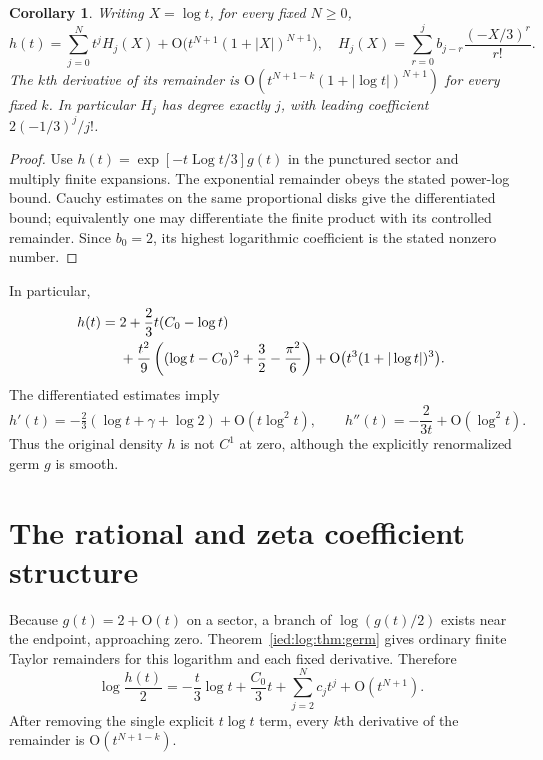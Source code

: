 \documentclass[11pt,letterpaper]{article}
\newtheorem{corollary}[theorem]{Corollary}
\theoremstyle{remark}\newtheorem{remark}[theorem]{Remark}
\newcommand{\Oh}{\mathrm O}\newcommand{\supp}{\operatorname{supp}}
\newcommand{\Log}{\operatorname{Log}}
\begin{document}
\begin{corollary}\label{ied:log:cor:densityseries}
Writing $X=\log t$, for every fixed $N\ge0$,
\begin{equation}\label{ied:log:eq:densityseries}
 h(t)=\sum_{j=0}^N t^jH_j(X)
 +\Oh\bigl(t^{N+1}(1+|X|)^{N+1}\bigr),\quad
 H_j(X)=\sum_{r=0}^j b_{j-r}\frac{(-X/3)^r}{r!}.
\end{equation}
The $k$th derivative of its remainder is
$\Oh(t^{N+1-k}(1+|\log t|)^{N+1})$ for every fixed $k$.
In particular $H_j$ has degree exactly $j$, with leading coefficient
$2(-1/3)^j/j!$.
\end{corollary}
\begin{proof}
Use $h(t)=\exp[-t\Log t/3]g(t)$ in the punctured sector and multiply finite expansions. The exponential remainder obeys the stated power-log bound. Cauchy estimates on the same proportional disks give the differentiated bound; equivalently one may differentiate the finite product with its controlled remainder. Since $b_0=2$, its highest logarithmic coefficient is the stated nonzero number.
\end{proof}
In particular,
\begin{align}\label{ied:log:eq:hfirst}
 h(t)={}&2+\frac23t(C_0-\log t)\notag\\
 &+\frac{t^2}{9}\left((\log t-C_0)^2+\frac32-\frac{\pi^2}{6}\right)
 +\Oh\bigl(t^3(1+|\log t|)^3\bigr).
\end{align}
The differentiated estimates imply
\[
 h'(t)=-\tfrac23(\log t+\gamma+\log2)+\Oh(t\log^2t),
 \qquad h''(t)=-\frac2{3t}+\Oh(\log^2t).
\]
Thus the original density $h$ is not $C^1$ at zero, although the explicitly renormalized germ $g$ is smooth.

\section{The rational and zeta coefficient structure}\label{ied:log:sec:coefficients}
Because $g(t)=2+\Oh(t)$ on a sector, a branch of $\log(g(t)/2)$ exists near the endpoint, approaching zero. Theorem~\ref{ied:log:thm:germ} gives ordinary finite Taylor remainders for this logarithm and each fixed derivative. Therefore
\begin{equation}\label{ied:log:eq:logdensity}
 \log\frac{h(t)}2=-\frac t3\log t+\frac{C_0}3t
          +\sum_{j=2}^N c_jt^j+\Oh(t^{N+1}).
\end{equation}
After removing the single explicit $t\log t$ term, every $k$th derivative of the remainder is $\Oh(t^{N+1-k})$.
\end{document}
